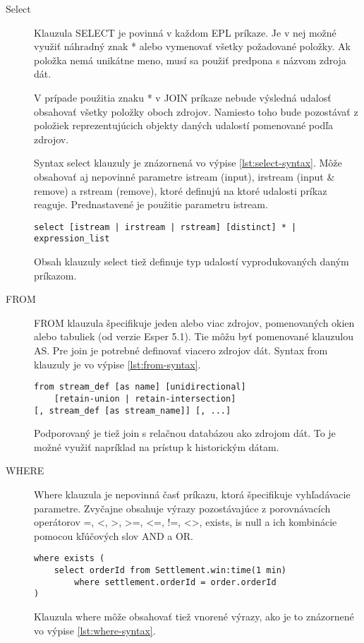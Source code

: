 		\begin{description}
			\item[Select] Klauzula SELECT je povinná v každom EPL príkaze. Je v nej možné využiť náhradný znak * alebo vymenovať všetky požadované položky. Ak položka nemá unikátne meno, musí sa použiť predpona s názvom zdroja dát. 
			
			V prípade použitia znaku * v JOIN príkaze nebude výsledná udalosť obsahovať všetky položky oboch zdrojov. Namiesto toho bude pozostávať z položiek reprezentujúcich objekty daných udalostí pomenované podľa zdrojov.
			
			Syntax select klauzuly je znázornená vo výpise \ref{lst:select-syntax}. Môže obsahovať aj nepovinné parametre istream (input), irstream (input \& remove) a rstream (remove), ktoré definujú na ktoré udalosti príkaz reaguje. Prednastavené je použitie parametru istream.
			\begin{lstlisting}[label=lst:select-syntax,belowskip=-30pt]
select [istream | irstream | rstream] [distinct] * | expression_list
			\end{lstlisting}
			Obsah klauzuly select tiež definuje typ udalostí vyprodukovaných daným príkazom.
			
			\item[FROM] FROM klauzula špecifikuje jeden alebo viac zdrojov, pomenovaných okien alebo tabuliek (od verzie Esper 5.1). Tie môžu byť pomenované klauzulou AS. Pre join je potrebné definovať viacero zdrojov dát. Syntax from klauzuly je vo výpise \ref{lst:from-syntax}.
			\begin{lstlisting}[label=lst:from-syntax]
from stream_def [as name] [unidirectional]
	[retain-union | retain-intersection] 
[, stream_def [as stream_name]] [, ...]
			\end{lstlisting}
			Podporovaný je tiež join s relačnou databázou ako zdrojom dát. To je možné využiť napríklad na prístup k historickým dátam.
			
			\item[WHERE] Where klauzula je nepovinná časť príkazu, ktorá špecifikuje vyhľadávacie parametre. Zvyčajne obsahuje výrazy pozostávajúce z porovnávacích operátorov =, \textless , \textgreater , \textgreater=, \textless=, !=, \textless\textgreater, exists, is null a ich kombinácie pomocou kľúčových slov AND a OR.
			\begin{lstlisting}[label=lst:where-syntax]
where exists (
	select orderId from Settlement.win:time(1 min) 
		where settlement.orderId = order.orderId
)
			\end{lstlisting}
			Klauzula where môže obsahovať tiež vnorené výrazy, ako je to znázornené vo výpise \ref{lst:where-syntax}.
			

\end{description}
